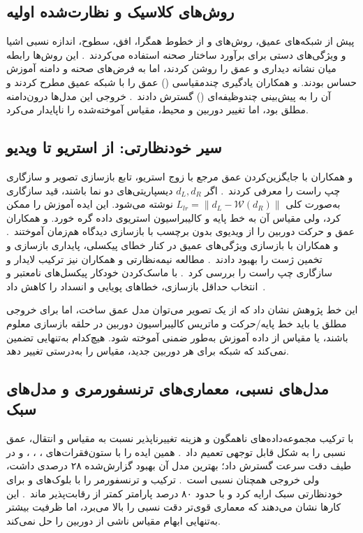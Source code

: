 \subsection{روش‌های کلاسیک و نظارت‌شده اولیه}
پیش از شبکه‌های عمیق، روش‌های  و  از خطوط همگرا، افق، سطوح، اندازه نسبی اشیا و ویژگی‌های دستی برای برآورد ساختار صحنه استفاده می‌کردند~\cite{Hoiem2005GeometricContext,Saxena2009Make3D}. این روش‌ها رابطه میان نشانه دیداری و عمق را روشن کردند، اما به فرض‌های صحنه و دامنه آموزش حساس بودند.  و همکاران یادگیری چندمقیاسی () عمق را با شبکه عمیق مطرح کردند و  آن را به پیش‌بینی چندوظیفه‌ای () گسترش دادند~\cite{Eigen2014Depth,Eigen2015Predicting}. خروجی این مدل‌ها درون‌دامنه مطلق بود، اما تغییر دوربین و محیط، مقیاس آموخته‌شده را ناپایدار می‌کرد.

\subsection{سیر خودنظارتی: از استریو تا ویدیو}
 و همکاران با جایگزین‌کردن عمق مرجع با زوج استریو، تابع بازسازی تصویر و سازگاری چپ راست را معرفی کردند~\cite{Godard2017Unsupervised}. اگر $d_L,d_R$ دیسپاریتی‌های دو نما باشند، قید سازگاری به‌صورت کلی $L_{lr}=\lVert d_L-\mathcal W(d_R)\rVert$ نوشته می‌شود. این ایده آموزش  را ممکن کرد، ولی مقیاس آن به خط پایه و کالیبراسیون استریوی داده گره خورد.
 و همکاران عمق و حرکت دوربین را از ویدیوی بدون برچسب با بازسازی دیدگاه هم‌زمان آموختند~\cite{Zhou2017Unsupervised}.  و همکاران با بازسازی ویژگی‌های عمیق در کنار خطای پیکسلی، پایداری بازسازی و تخمین ژست را بهبود دادند~\cite{Zhan2018DeepFeatureReconstruction}. مطالعه نیمه‌نظارتی  و همکاران نیز ترکیب لایدار و سازگاری چپ راست را بررسی کرد~\cite{Amiri2019SemiSupervised}.  با ماسک‌کردن خودکار پیکسل‌های نامعتبر و انتخاب حداقل بازسازی، خطاهای پویایی و انسداد را کاهش داد~\cite{Godard2019Digging}.

این خط پژوهش نشان داد که از یک تصویر می‌توان مدل عمق ساخت، اما برای خروجی مطلق یا باید خط پایه/حرکت و ماتریس کالیبراسیون دوربین در حلقه بازسازی معلوم باشند، یا مقیاس از داده آموزش به‌طور ضمنی آموخته شود. هیچ‌کدام به‌تنهایی تضمین نمی‌کند که شبکه برای هر دوربین جدید، مقیاس را به‌درستی تغییر دهد.

\subsection{مدل‌های نسبی، معماری‌های ترنسفورمری و مدل‌های سبک}
 با ترکیب مجموعه‌داده‌های ناهمگون و هزینه تغییرناپذیر نسبت به مقیاس و انتقال، عمق نسبی را به شکل قابل توجهی تعمیم داد~\cite{Ranftl2019Robust}.  همین ایده را با ستون‌فقرات‌های ، ، ،  و  در طیف دقت سرعت گسترش داد؛ بهترین مدل آن بهبود گزارش‌شده ۲۸ درصدی داشت، ولی خروجی همچنان نسبی است~\cite{MiDaSV31}.
 ترکیب  و ترنسفورمر را با بلوک‌های  و  برای خودنظارتی سبک ارایه کرد و با حدود ۸۰ درصد پارامتر کمتر از  رقابت‌پذیر ماند~\cite{LiteMono}. این کارها نشان می‌دهند که معماری قوی‌تر دقت نسبی را بالا می‌برد، اما ظرفیت بیشتر به‌تنهایی ابهام مقیاس ناشی از دوربین را حل نمی‌کند.

